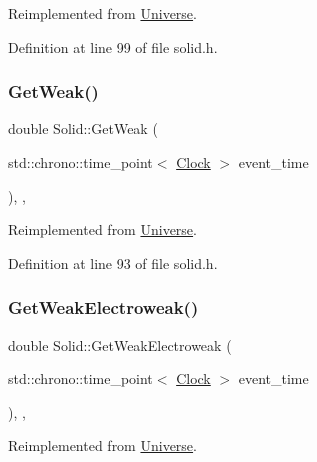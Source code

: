 Reimplemented from \mbox{\hyperlink{class_universe_af0f4b81950061e63c2855eb40957a5b1}{Universe}}.



Definition at line 99 of file solid.\+h.

\mbox{\label{class_solid_ac8a7738735a6bda4e89414a2b0c370e1}} 
\subsubsection{\texorpdfstring{Get\+Weak()}{GetWeak()}}
{\footnotesize\ttfamily double Solid\+::\+Get\+Weak (\begin{DoxyParamCaption}\item[{std\+::chrono\+::time\+\_\+point$<$ \mbox{\hyperlink{universe_8h_a0ef8d951d1ca5ab3cfaf7ab4c7a6fd80}{Clock}} $>$}]{event\+\_\+time }\end{DoxyParamCaption})\hspace{0.3cm}{\ttfamily [inline]}, {\ttfamily [final]}, {\ttfamily [virtual]}}



Reimplemented from \mbox{\hyperlink{class_universe_a4476b7e0a3fc1764909f556257fd9ec7}{Universe}}.



Definition at line 93 of file solid.\+h.

\mbox{\label{class_solid_ac98f9c827d58a631627423e25dd611ba}} 
\subsubsection{\texorpdfstring{Get\+Weak\+Electroweak()}{GetWeakElectroweak()}}
{\footnotesize\ttfamily double Solid\+::\+Get\+Weak\+Electroweak (\begin{DoxyParamCaption}\item[{std\+::chrono\+::time\+\_\+point$<$ \mbox{\hyperlink{universe_8h_a0ef8d951d1ca5ab3cfaf7ab4c7a6fd80}{Clock}} $>$}]{event\+\_\+time }\end{DoxyParamCaption})\hspace{0.3cm}{\ttfamily [inline]}, {\ttfamily [final]}, {\ttfamily [virtual]}}



Reimplemented from \mbox{\hyperlink{class_universe_a645299738e6b798a037f2a15a2e7cf4d}{Universe}}.



